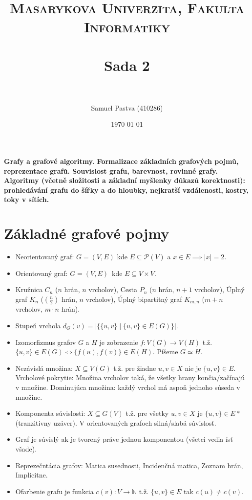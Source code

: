 \documentclass[paper=a4, fontsize=11pt]{scrartcl} %
\title{	
	\normalfont \normalsize 
	\textsc{Masarykova Univerzita, Fakulta Informatiky} \\ [25pt] %
	\horrule{0.5pt} \\[0.4cm] %
	\huge Sada 2 \\ %
	\horrule{2pt} \\[0.5cm] %
}
\author{Samuel Pastva (410286)} %
\date{\normalsize\today} %
\numberwithin{equation}{section} %
\numberwithin{figure}{section} %
\numberwithin{table}{section} %
\begin{document}
	
	\textbf{Grafy a grafové algoritmy. Formalizace základních grafových pojmů, reprezentace grafů. Souvislost grafu, barevnost, rovinné grafy. Algoritmy (včetně složitosti a základní myšlenky důkazů korektnosti): prohledávání grafu do šířky a do hloubky, nejkratší vzdálenosti, kostry, toky v sítích.}
	
	\section{Základné grafové pojmy}
	
	\begin{itemize}
		\item Neorientovaný graf: $G = (V, E)$ kde $E \subseteq \mathcal{P}(V)$ a $x \in E \implies |x| = 2$. 

		\item Orientovaný graf: $G = (V, E)$ kde $E \subseteq V \times V$.

		\item Kružnica $C_n$ ($n$ hrán, $n$ vrcholov), Cesta $P_n$ ($n$ hrán, $n+1$ vrcholov), Úplný graf $K_n$ ($(\frac{n}{2})$ hrán, $n$ vrcholov), Úplný bipartitný graf $K_{m,n}$ ($m + n$ vrcholov, $m \cdot n$ hrán).
		
		\item Stupeň vrchola $d_G(v) = | \{\{u,v\} \mid \{u,v\} \in E(G) \} |$.
		
		\item Izomorfizmus grafov $G$ a $H$ je zobrazenie $f: V(G) \to V(H)$ t.ž. $\{u,v\} \in E(G) \iff \{f(u), f(v)\} \in E(H)$. Píšeme $G \simeq H$.
		
		\item Nezávislá množina: $X \subseteq V(G)$ t.ž. pre žiadne $u, v \in X$ nie je $\{u,v\} \in E$. Vrcholové pokrytie: Množina vrcholov taká, že všetky hrany končia/začínajú v množine. Dominujúca množina: každý vrchol má aspoň jednoho súseda v množine.
		
		\item Komponenta súvislosti: $X \subseteq G(V)$ t.ž. pre všetky $u, v \in X$ je $\{u, v\} \in E*$ (tranzitívny uzáver). V orientovaných grafoch silná/slabá súvislosť.
		
		\item Graf je súvislý ak je tvorený práve jednou komponentou (všetci vedia ísť všade).  
		
		\item Reprezečntácia grafov: Matica susednosti, Incidenčná matica, Zoznam hrán, Implicitne.
		
		\item Ofarbenie grafu je funkcia $c(v) : V \to \mathbb{N}$ t.ž. $\{u,v\} \in E$ tak $c(u) \not= c(v)$.
		

\end{itemize}
\end{document}
